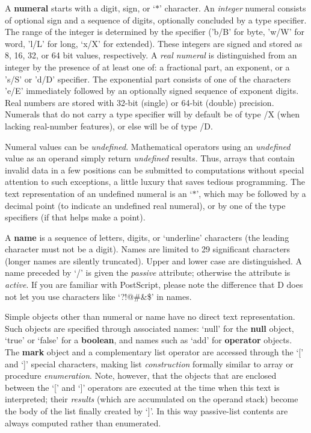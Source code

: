 A \textbf{numeral}  starts  with  a  digit,   sign,   or  `$\ast$'   character.   An \emph{integer} numeral consists of optional  sign and a sequence  of  digits, optionally concluded  by a type specifier.  The range of the  integer  is determined by the specifier ('b/B' for byte,  'w/W' for word,  'l/L'  for long, `x/X' for extended). These integers are signed and stored as 8, 16, 32, or 64 bit values, respectively. A \emph{real numeral} is distinguished from an integer  by  the  presence  of at least one  of:  a  fractional  part,  an exponent,  or a 's/S' or 'd/D'  specifier.  The exponential part consists of one  of the  characters  'e/E'  immediately followed by an optionally signed  sequence  of exponent   digits.   Real  numbers are  stored  with  32-bit   (single) or 64-bit (double) precision. Numerals that do not carry a type specifier will by default be of type /X (when lacking real-number features), or else will be of type /D.

Numeral  values  can  be  \emph{undefined}.  Mathematical  operators  using  an \emph{undefined} value as an operand simply return \emph{undefined} results. Thus, arrays that contain invalid data in a few positions can be submitted to  computations without special attention to such exceptions,  a little luxury that saves tedious programming.  The text representation of an undefined numeral  is an  `$\ast$',  which  may  be  followed by a decimal  point  (to  indicate  an undefined real numeral), or by one of the type specifiers (if that helps make a point). 

A \textbf{name} is a sequence of letters,  digits, or `underline' characters (the leading character must not be a digit). Names are limited to 29 significant characters (longer names are silently truncated).  Upper and lower case are distinguished. A name preceded by `/' is given the \emph{passive} attribute; otherwise the attribute is \emph{active}.  If you are familiar with  PostScript, please note the difference that D does not let you use characters like `?!@\#\&\$' in names.

Simple  objects  other  than  numeral  or  name  have  no  direct   text representation.  Such  objects  are specified through  associated  names: `null' for the \textbf{null} object,  `true' or `false' for a \textbf{boolean},  and  names such as `add' for \textbf{operator} objects.  The \textbf{mark} object and a  complementary list  operator  are accessed through the `[' and `]'  special  characters, making  list  \emph{construction} formally  similar  to  array  or   procedure \emph{enumeration}. Note, however, that the objects that are enclosed between the `[' and `]' operators are executed at the time when this text is interpreted; their \emph{results} (which are accumulated on the operand stack) become the body of the list finally created by `]'. In this way passive-list contents are always computed rather than enumerated.

